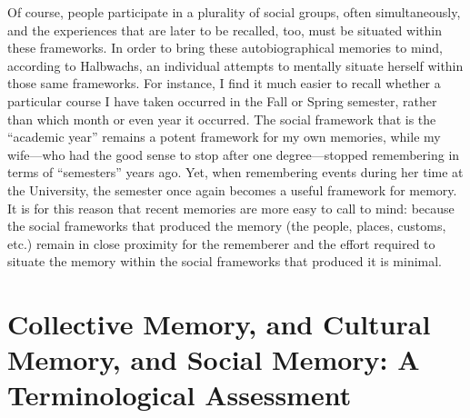 Of course, people participate in a plurality of social groups, often
simultaneously, and the experiences that are later to be recalled, too,
must be situated within these frameworks. In order to bring these
autobiographical memories to mind, according to Halbwachs, an individual
attempts to mentally situate herself within those same frameworks. For
instance, I find it much easier to recall whether a particular course I
have taken occurred in the Fall or Spring semester, rather than which
month or even year it occurred. The social framework that is the
``academic year'' remains a potent framework for my own memories, while
my wife---who had the good sense to stop after one degree---stopped
remembering in terms of ``semesters'' years ago. Yet, when remembering
events during her time at the University, the semester once again
becomes a useful framework for memory. It is for this reason that recent
memories are more easy to call to mind: because the social frameworks
that produced the memory (the people, places, customs, etc.) remain in
close proximity for the rememberer and the effort required to situate
the memory within the social frameworks that produced it is
minimal.\autocite[52]{halbwachs1992}

\hypertarget{collective-memory-and-cultural-memory-and-social-memory-a-terminological-assessment}{%
\section{Collective Memory, and Cultural Memory, and Social Memory: A
Terminological
Assessment}\label{collective-memory-and-cultural-memory-and-social-memory-a-terminological-assessment}}

